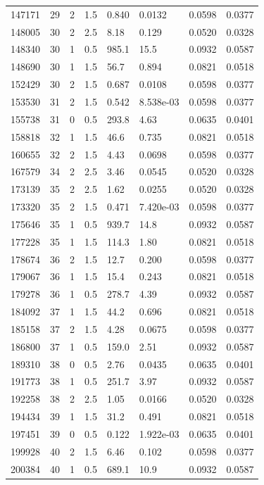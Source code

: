 \documentclass[preview]{standalone}
\begin{document}
{{{\begin{tabular}{L{1.2cm}C{1.2cm} C{0.3cm}C{0.5cm} C{1.4cm}C{1.4cm} C{1.4cm}C{1.4cm}}
  147171  &    29  & 2     & 1.5 &  0.840  & 0.0132  & 0.0598 &  0.0377   \\ 
  148005  &    30  & 2     & 2.5 &  8.18  & 0.129  & 0.0520 &  0.0328   \\ 
  148340  &    30  & 1     & 0.5 &  985.1  & 15.5  & 0.0932 &  0.0587   \\ 
  148690  &    30  & 1     & 1.5 &  56.7  & 0.894  & 0.0821 &  0.0518   \\ 
  152429  &    30  & 2     & 1.5 &  0.687  & 0.0108  & 0.0598 &  0.0377   \\ 
  153530  &    31  & 2     & 1.5 &  0.542  & 8.538e-03  & 0.0598 &  0.0377   \\ 
  155738  &    31  & 0     & 0.5 &  293.8  & 4.63  & 0.0635 &  0.0401   \\ 
  158818  &    32  & 1     & 1.5 &  46.6  & 0.735  & 0.0821 &  0.0518   \\ 
  160655  &    32  & 2     & 1.5 &  4.43  & 0.0698  & 0.0598 &  0.0377   \\ 
  167579  &    34  & 2     & 2.5 &  3.46  & 0.0545  & 0.0520 &  0.0328   \\ 
  173139  &    35  & 2     & 2.5 &  1.62  & 0.0255  & 0.0520 &  0.0328   \\ 
  173320  &    35  & 2     & 1.5 &  0.471  & 7.420e-03  & 0.0598 &  0.0377   \\ 
  175646  &    35  & 1     & 0.5 &  939.7  & 14.8  & 0.0932 &  0.0587   \\ 
  177228  &    35  & 1     & 1.5 &  114.3  & 1.80  & 0.0821 &  0.0518   \\ 
  178674  &    36  & 2     & 1.5 &  12.7  & 0.200  & 0.0598 &  0.0377   \\ 
  179067  &    36  & 1     & 1.5 &  15.4  & 0.243  & 0.0821 &  0.0518   \\ 
  179278  &    36  & 1     & 0.5 &  278.7  & 4.39  & 0.0932 &  0.0587   \\ 
  184092  &    37  & 1     & 1.5 &  44.2  & 0.696  & 0.0821 &  0.0518   \\ 
  185158  &    37  & 2     & 1.5 &  4.28  & 0.0675  & 0.0598 &  0.0377   \\ 
  186800  &    37  & 1     & 0.5 &  159.0  & 2.51  & 0.0932 &  0.0587   \\ 
  189310  &    38  & 0     & 0.5 &  2.76  & 0.0435  & 0.0635 &  0.0401   \\ 
  191773  &    38  & 1     & 0.5 &  251.7  & 3.97  & 0.0932 &  0.0587   \\ 
  192258  &    38  & 2     & 2.5 &  1.05  & 0.0166  & 0.0520 &  0.0328   \\ 
  194434  &    39  & 1     & 1.5 &  31.2  & 0.491  & 0.0821 &  0.0518   \\ 
  197451  &    39  & 0     & 0.5 &  0.122  & 1.922e-03  & 0.0635 &  0.0401   \\ 
  199928  &    40  & 2     & 1.5 &  6.46  & 0.102  & 0.0598 &  0.0377   \\ 
  200384  &    40  & 1     & 0.5 &  689.1  & 10.9  & 0.0932 &  0.0587   \\ 
\hline 
\end{tabular} 

}}}
\end{document}
